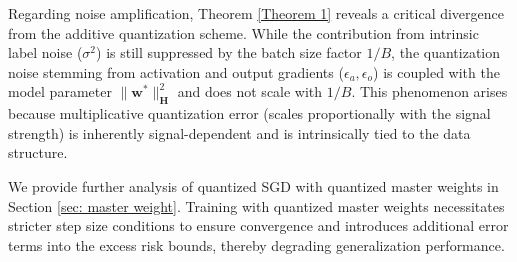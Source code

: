\documentclass[11pt, letterpaper]{article}
\begin{document}
Regarding noise amplification, Theorem \ref{Theorem 1} reveals a critical divergence from the additive quantization scheme. While the contribution from intrinsic label noise ($\sigma^2$) is still suppressed by the batch size factor $1/B$, the quantization noise stemming from activation and output gradients ($\epsilon_a, \epsilon_o$) is coupled with the model parameter $\|\mathbf{w}^*\|_\mathbf{H}^2$ and does not scale with $1/B$. This phenomenon arises because multiplicative quantization error (scales proportionally with the signal strength) is inherently signal-dependent and is intrinsically tied to the data structure.

We provide further analysis of quantized SGD with quantized master weights in Section \ref{sec: master weight}. Training with quantized master weights necessitates stricter step size conditions to ensure convergence and introduces additional error terms into the excess risk bounds, thereby degrading generalization performance.
\end{document}
